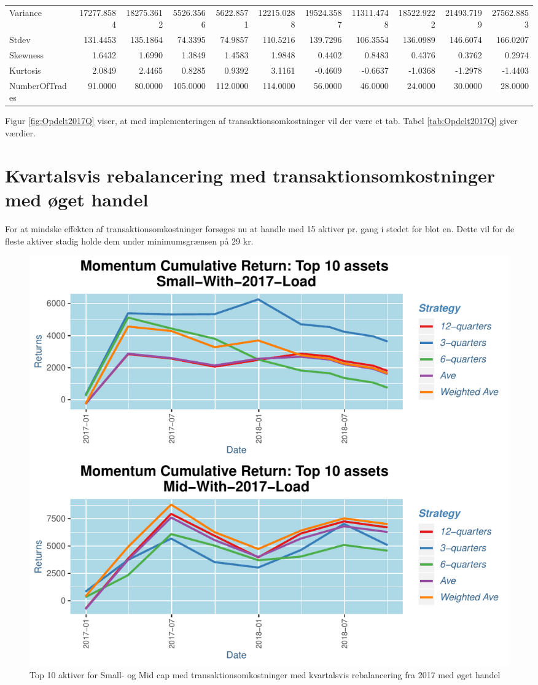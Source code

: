 \documentclass[]{article}
\begin{document}
\begin{table}
{\begin{tabular}[t]{lrrrrrrrrrr}
Variance & 17277.8584 & 18275.3612 & 5526.3566 & 5622.8571 & 12215.0288 & 19524.3587 & 11311.4748 & 18522.9222 & 21493.7199 & 27562.8853\\
Stdev & 131.4453 & 135.1864 & 74.3395 & 74.9857 & 110.5216 & 139.7296 & 106.3554 & 136.0989 & 146.6074 & 166.0207\\
Skewness & 1.6432 & 1.6990 & 1.3849 & 1.4583 & 1.9848 & 0.4402 & 0.8483 & 0.4376 & 0.3762 & 0.2974\\
\addlinespace
Kurtosis & 2.0849 & 2.4465 & 0.8285 & 0.9392 & 3.1161 & -0.4609 & -0.6637 & -1.0368 & -1.2978 & -1.4403\\
NumberOfTrades & 91.0000 & 80.0000 & 105.0000 & 112.0000 & 114.0000 & 56.0000 & 46.0000 & 24.0000 & 30.0000 & 28.0000\\
\bottomrule
\end{tabular}}
\end{table}

Figur \ref{fig:Opdelt2017Q} viser, at med implementeringen af
transaktionsomkostninger vil der være et tab. Tabel
\ref{tab:Opdelt2017Q} giver værdier.

\hypertarget{kvartalsvis-rebalancering-med-transaktionsomkostninger-med-get-handel}{%
\section{Kvartalsvis rebalancering med transaktionsomkostninger med øget
handel}\label{kvartalsvis-rebalancering-med-transaktionsomkostninger-med-get-handel}}

For at mindske effekten af transaktionsomkostninger forsøges nu at
handle med 15 aktiver pr. gang i stedet for blot en. Dette vil for de
fleste aktiver stadig holde dem under minimumsgrænsen på 29 kr.

\begin{figure}
\centering
\includegraphics{IPA_Small_and_Mid_files/figure-latex/fig6-1.pdf}
\caption{\label{fig:Opdelt2017QLoad}Top 10 aktiver for Small- og Mid cap
med transaktionsomkostninger med kvartalsvis rebalancering fra 2017 med
øget handel}
\end{figure}
\end{document}
